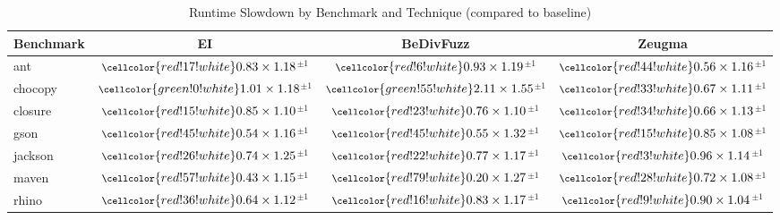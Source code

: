 \begin{table}[t]
\centering
\scriptsize
\caption{Runtime Slowdown by Benchmark and Technique (compared to baseline)}
\begin{tabular}{l|ccc}
\toprule
\textbf{Benchmark} & \textbf{EI} & \textbf{BeDivFuzz} & \textbf{Zeugma} \\
\midrule
ant & $\footnotesize\cellcolor{red!17!white}0.83\times 1.18$$^{\pm 1}$ & $\footnotesize\cellcolor{red!6!white}0.93\times 1.19$$^{\pm 1}$ & $\footnotesize\cellcolor{red!44!white}0.56\times 1.16$$^{\pm 1}$ \\
chocopy & $\footnotesize\cellcolor{green!0!white}1.01\times 1.18$$^{\pm 1}$ & $\footnotesize\cellcolor{green!55!white}2.11\times 1.55$$^{\pm 1}$ & $\footnotesize\cellcolor{red!33!white}0.67\times 1.11$$^{\pm 1}$ \\
closure & $\footnotesize\cellcolor{red!15!white}0.85\times 1.10$$^{\pm 1}$ & $\footnotesize\cellcolor{red!23!white}0.76\times 1.10$$^{\pm 1}$ & $\footnotesize\cellcolor{red!34!white}0.66\times 1.13$$^{\pm 1}$ \\
gson & $\footnotesize\cellcolor{red!45!white}0.54\times 1.16$$^{\pm 1}$ & $\footnotesize\cellcolor{red!45!white}0.55\times 1.32$$^{\pm 1}$ & $\footnotesize\cellcolor{red!15!white}0.85\times 1.08$$^{\pm 1}$ \\
jackson & $\footnotesize\cellcolor{red!26!white}0.74\times 1.25$$^{\pm 1}$ & $\footnotesize\cellcolor{red!22!white}0.77\times 1.17$$^{\pm 1}$ & $\footnotesize\cellcolor{red!3!white}0.96\times 1.14$$^{\pm 1}$ \\
maven & $\footnotesize\cellcolor{red!57!white}0.43\times 1.15$$^{\pm 1}$ & $\footnotesize\cellcolor{red!79!white}0.20\times 1.27$$^{\pm 1}$ & $\footnotesize\cellcolor{red!28!white}0.72\times 1.08$$^{\pm 1}$ \\
rhino & $\footnotesize\cellcolor{red!36!white}0.64\times 1.12$$^{\pm 1}$ & $\footnotesize\cellcolor{red!16!white}0.83\times 1.17$$^{\pm 1}$ & $\footnotesize\cellcolor{red!9!white}0.90\times 1.04$$^{\pm 1}$ \\
\bottomrule
\end{tabular}
\label{tab:runtime_slowdown}
\end{table}